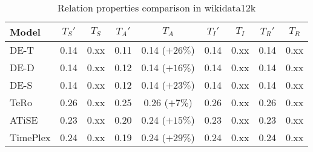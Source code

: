 \begin{table*}[htb]
\centering
\begin{minipage}{0.95\textwidth}
\centering
\caption{Relation properties comparison in wikidata12k}
\vspace{-3mm}

\begin{tabular}{l|cc|cc|cc|cc}\hline
Model       & $T_S'$ & $T_S$ & $T_A'$ & $T_A$ & $T_I'$ & $T_I$ & $T_R'$ & $T_R$ \\ \hline
DE-T & 0.14 & 0.xx & 0.11 & 0.14 (\textcolor{textgreen}{$+26\%$}) & 0.14 & 0.xx & 0.14 & 0.xx \\ 
DE-D & 0.14 & 0.xx & 0.12 & 0.14 (\textcolor{textgreen}{$+16\%$}) & 0.14 & 0.xx & 0.14 & 0.xx \\ 
DE-S & 0.14 & 0.xx & 0.12 & 0.14 (\textcolor{textgreen}{$+23\%$}) & 0.14 & 0.xx & 0.14 & 0.xx \\ 
TeRo & 0.26 & 0.xx & 0.25 & 0.26 (\textcolor{textgreen}{$+7\%$}) & 0.26 & 0.xx & 0.26 & 0.xx \\ 
ATiSE & 0.23 & 0.xx & 0.20 & 0.24 (\textcolor{textgreen}{$+15\%$}) & 0.23 & 0.xx & 0.23 & 0.xx \\ 
TimePlex & 0.24 & 0.xx & 0.19 & 0.24 (\textcolor{textgreen}{$+29\%$}) & 0.24 & 0.xx & 0.24 & 0.xx \\ 
 \hline
\end{tabular}

\label{fig:relation_properties_wikidata12k_comparison}
\end{minipage}
\end{table*}

